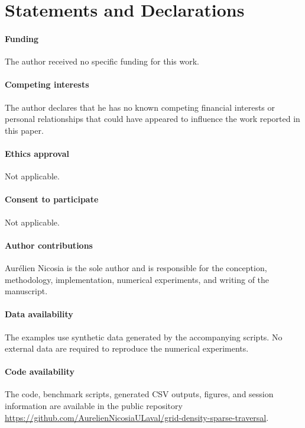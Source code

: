 \documentclass[pdflatex,sn-mathphys-ay]{sn-jnl}
\theoremstyle{thmstyleone}
\begin{document}
\section*{Statements and Declarations}

\paragraph{Funding}
The author received no specific funding for this work.

\paragraph{Competing interests}
The author declares that he has no known competing financial interests or personal relationships that could have appeared to influence the work reported in this paper.

\paragraph{Ethics approval}
Not applicable.

\paragraph{Consent to participate}
Not applicable.

\paragraph{Author contributions}
Aur{\'e}lien Nicosia is the sole author and is responsible for the conception, methodology, implementation, numerical experiments, and writing of the manuscript.

\paragraph{Data availability}
The examples use synthetic data generated by the accompanying scripts. No external data are required to reproduce the numerical experiments.

\paragraph{Code availability}
The code, benchmark scripts, generated CSV outputs, figures, and session information are available in the public repository \url{https://github.com/AurelienNicosiaULaval/grid-density-sparse-traversal}.


\end{document}
